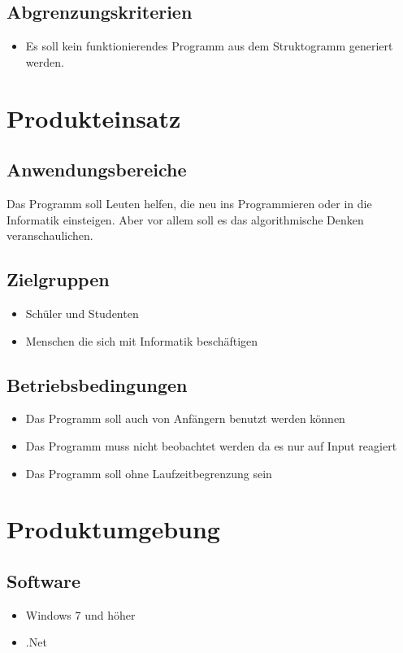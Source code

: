 \documentclass[a4paper,10pt]{report}
\begin{document}
\subsection{Abgrenzungskriterien}
\begin{itemize}
\item Es soll kein funktionierendes Programm aus dem Struktogramm generiert werden.
\end{itemize}

\section{Produkteinsatz}
\subsection{Anwendungsbereiche}
Das Programm soll Leuten helfen, die neu ins Programmieren oder in die Informatik einsteigen. Aber vor allem soll es das algorithmische Denken veranschaulichen.
\subsection{Zielgruppen}
\begin{itemize}
\item Schüler und Studenten
\item Menschen die sich mit Informatik beschäftigen
\end{itemize}
\subsection{Betriebsbedingungen}
\begin{itemize}
\item Das Programm soll auch von Anfängern benutzt werden können
\item Das Programm muss nicht beobachtet werden da es nur auf Input reagiert
\item Das Programm soll ohne Laufzeitbegrenzung sein
\end{itemize}
\section{Produktumgebung}
\subsection{Software}
\begin{itemize}
\item Windows 7 und höher
\item .Net
\end{itemize}
\end{document}
